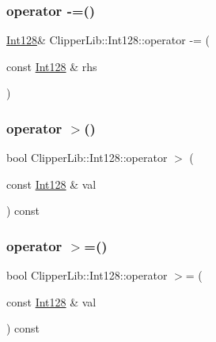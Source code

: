 \mbox{\label{class_clipper_lib_1_1_int128_ac9e4f8071a67423ec19759d60ff00730}} 
\subsubsection{\texorpdfstring{operator -\/=()}{operator -=()}}
{\footnotesize\ttfamily \mbox{\hyperlink{class_clipper_lib_1_1_int128}{Int128}}\& Clipper\+Lib\+::\+Int128\+::operator -\/= (\begin{DoxyParamCaption}\item[{const \mbox{\hyperlink{class_clipper_lib_1_1_int128}{Int128}} \&}]{rhs }\end{DoxyParamCaption})\hspace{0.3cm}{\ttfamily [inline]}}

\mbox{\label{class_clipper_lib_1_1_int128_a851e15de15e68fb7db0f08431b8e3e48}} 
\subsubsection{\texorpdfstring{operator $>$()}{operator >()}}
{\footnotesize\ttfamily bool Clipper\+Lib\+::\+Int128\+::operator $>$ (\begin{DoxyParamCaption}\item[{const \mbox{\hyperlink{class_clipper_lib_1_1_int128}{Int128}} \&}]{val }\end{DoxyParamCaption}) const\hspace{0.3cm}{\ttfamily [inline]}}

\mbox{\label{class_clipper_lib_1_1_int128_a54419dd93804b83dabb20f7962c6fbf7}} 
\subsubsection{\texorpdfstring{operator $>$=()}{operator >=()}}
{\footnotesize\ttfamily bool Clipper\+Lib\+::\+Int128\+::operator $>$= (\begin{DoxyParamCaption}\item[{const \mbox{\hyperlink{class_clipper_lib_1_1_int128}{Int128}} \&}]{val }\end{DoxyParamCaption}) const\hspace{0.3cm}{\ttfamily [inline]}}

